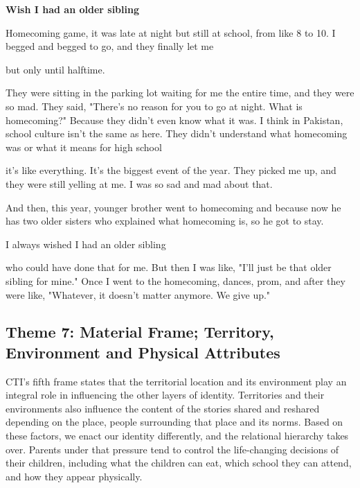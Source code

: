 \textbf{Wish I had an older sibling}

\begin{FoundPoem}
Homecoming game, it was late at night but still at school, from like 8 to 10. I
begged and begged to go, and they finally let me 

but only until halftime.

They were sitting in the parking lot waiting for me the entire time, and they
were so mad. They said, "There’s no reason for you to go at night. What is
homecoming?" Because they didn’t even know what it was. I think in Pakistan,
school culture isn’t the same as here. They didn’t understand what
homecoming was or what it means for high school 

it’s like everything. It’s the biggest event of the year.
They picked me up, and they were still yelling at me. I was so sad and mad
about that.

And then, this year, younger brother went to homecoming   and because now
he has two older sisters who explained what homecoming is, so he got to stay.

I always wished I had an older sibling 

who could have done that for me. But then I was like, "I’ll just be that older
sibling for mine." Once I went to the homecoming, dances, prom, and after they
were like, "Whatever, it doesn’t matter anymore. We give up."
\end{FoundPoem}

\subsection{Theme 7: Material Frame; Territory, Environment and Physical Attributes}

CTI’s fifth frame states that the territorial location and its environment play an integral role in influencing the other layers of identity. Territories and their environments also influence the content of the stories shared and reshared depending on the place, people surrounding that place and its norms. Based on these factors, we enact our identity differently, and the relational hierarchy takes over. Parents under that pressure tend to control the life-changing decisions of their children, including what the children can eat, which school they can attend, and how they appear physically. 

